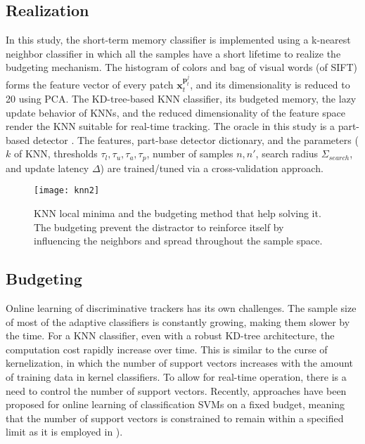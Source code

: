 \documentclass[conference,twoside]{IEEEtran}
\begin{document}
\subsection{Realization}
\label{sect:realize}
In this study, the short-term memory classifier is implemented using a k-nearest neighbor classifier in which all the samples have a short lifetime to realize the budgeting mechanism. The histogram of colors and bag of visual words (of SIFT) forms the feature vector of every patch $\mathbf{x}^{\mathbf{p}^j_t}_t$, and its dimensionality is reduced to 20 using PCA. The KD-tree-based KNN classifier, its budgeted memory, the lazy update behavior of KNNs, and the reduced dimensionality of the feature space render the KNN suitable for real-time tracking. The oracle in this study is a part-based detector \cite{felzenszwalb2010object}. The features, part-base detector dictionary, and the parameters ($k$ of KNN, thresholds $\tau_l,\tau_u,\tau_a,\tau_p$, number of samples $n,n'$, search radius $\Sigma_{search}$, and update latency $\Delta$) are trained/tuned via a cross-validation approach.

\begin{figure}[!t]
\centering
\texttt{[image: knn2]}
\caption{KNN local minima and the budgeting method that help solving it. The budgeting prevent the distractor to reinforce itself by influencing the neighbors and spread throughout the sample space.}
\label{fig:knn_minima}
\vspace{-0.7 cm}
\end{figure}

\subsection{Budgeting} 
\label{sect:budget}
Online learning of discriminative trackers has its own challenges. The sample size of most of the adaptive classifiers is constantly growing, making them slower by the time. For a KNN classifier, even with a robust KD-tree architecture, the computation cost rapidly increase over time. This is similar to the curse of kernelization, in which the number of support vectors increases with the amount of training data in kernel classifiers. To allow for real-time operation, there is a need to control the number of support vectors. Recently, approaches have been proposed for online learning of classification SVMs on a fixed budget, meaning that the number of support vectors is constrained to remain within a specified limit as it is employed in \cite{hare2011struck}). 
\end{document}
